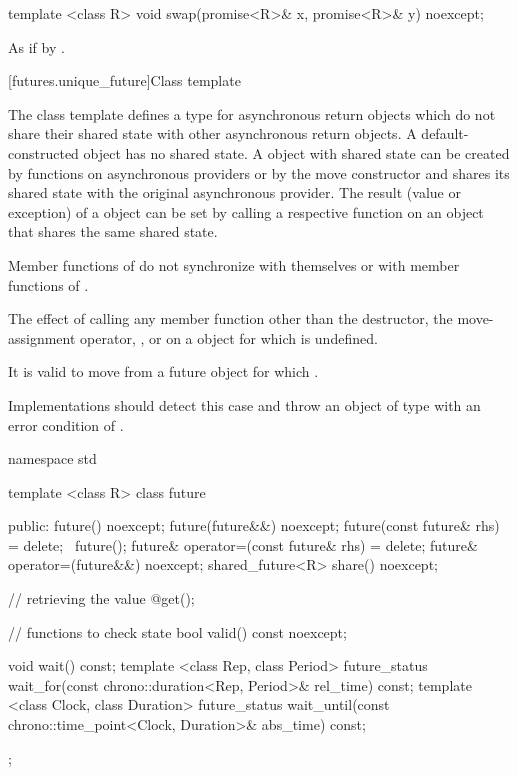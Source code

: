 %
\begin{itemdecl}
template <class R>
  void swap(promise<R>& x, promise<R>& y) noexcept;
\end{itemdecl}

\begin{itemdescr}
\pnum
\effects As if by .
\end{itemdescr}

[futures.unique_future]{Class template }

\pnum
The class template  defines a type for asynchronous return objects which
do not share their shared state with other asynchronous return objects.
A default-constructed  object has no
shared state. A  object with shared state can be created by
functions on asynchronous providers or by the move constructor
and shares its shared state with
the original asynchronous provider. The result (value or exception) of
a  object
can be
set by
calling a respective function on an
object that shares the same
shared state.

\pnum
\begin{note} Member functions of  do not synchronize with themselves or with
member functions of . \end{note}

\pnum
The effect of calling any member function other than the destructor, the
move-assignment operator, , or  on a  object for which
is undefined.
\begin{note} It is valid to move from a future object for which .
\end{note}
\begin{note} Implementations should detect this case and throw an object of type
 with an error condition of . \end{note}

%
\begin{codeblock}
namespace std {
  template <class R>
  class future {
  public:
    future() noexcept;
    future(future&&) noexcept;
    future(const future& rhs) = delete;
    ~future();
    future& operator=(const future& rhs) = delete;
    future& operator=(future&&) noexcept;
    shared_future<R> share() noexcept;

    // retrieving the value
    @\seebelow@ get();

    // functions to check state
    bool valid() const noexcept;

    void wait() const;
    template <class Rep, class Period>
      future_status wait_for(const chrono::duration<Rep, Period>& rel_time) const;
    template <class Clock, class Duration>
      future_status wait_until(const chrono::time_point<Clock, Duration>& abs_time) const;
  };
}
\end{codeblock}

